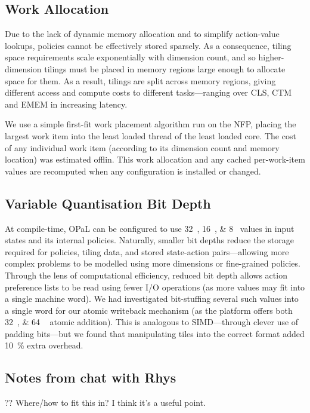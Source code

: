 \documentclass[sigconf,natbib=false]{acmart}
\newcommand{\approachshort}{OPaL}
\begin{document}
\subsection{Work Allocation}
Due to the lack of dynamic memory allocation and to simplify action-value lookups, policies cannot be effectively stored sparsely.
As a consequence, tiling space requirements scale exponentially with dimension count, and so higher-dimension tilings must be placed in memory regions large enough to allocate space for them.
As a result, tilings are split across memory regions, giving different access and compute costs to different tasks---ranging over CLS, CTM and EMEM in increasing latency.

We use a simple first-fit work placement algorithm run on the NFP, placing the largest work item into the least loaded thread of the least loaded core.
The cost of any individual work item (according to its dimension count and memory location) was estimated offlin.
This work allocation and any cached per-work-item values are recomputed when any configuration is installed or changed.

\subsection{Variable Quantisation Bit Depth}
At compile-time, \approachshort{} can be configured to use \SIlist[list-final-separator = { \translate{or} }]{32;16;8}{\bit} values in input states and its internal policies.
Naturally, smaller bit depths reduce the storage required for policies, tiling data, and stored state-action pairs---allowing more complex problems to be modelled using more dimensions or fine-grained policies.
Through the lens of computational efficiency, reduced bit depth allows action preference lists to be read using fewer I/O operations (as more values may fit into a single machine word).
We had investigated bit-stuffing several such values into a single word for our atomic writeback mechanism (as the platform offers both \SIlist{32;64
}{\bit} atomic addition).
This is analogous to SIMD---through clever use of padding bits---but we found that manipulating tiles into the correct format added \SI{10}{\percent} extra overhead.

\subsection{Notes from chat with Rhys}
?? Where/how to fit this in? I think it's a useful point.
\end{document}
